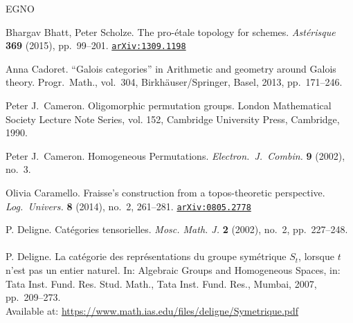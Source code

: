 \documentclass[12pt]{amsart}
\numberwithin{equation}{section}
\theoremstyle{definition}
\newcommand{\arxiv}[1]{\href{http://arxiv.org/abs/#1}{{\tiny\tt arXiv:#1}}}
\newcommand{\DOI}[1]{\href{http://doi.org/#1}{\color{purple}{\tiny\tt DOI:#1}}}
\begin{document}
\begin{thebibliography}{EGNO}

 Bhargav Bhatt, Peter Scholze. The pro-\'etale topology for schemes. \textit{Ast\'erisque} \textbf{369} (2015), pp.~99--201. \arxiv{1309.1198}

 Anna Cadoret. ``Galois categories'' in Arithmetic and geometry around Galois theory. Progr.\ Math., vol.\ 304, Birkh\"auser/Springer, Basel, 2013, pp.~171--246. \DOI{10.1007/978-3-0348-0487-5\_3}


 Peter J.\ Cameron. Oligomorphic permutation groups. London Mathematical Society Lecture Note Series, vol. 152, Cambridge University Press, Cambridge, 1990.

 Peter J.\ Cameron. Homogeneous Permutations. \textit{Electron.\ J.\ Combin.} \textbf{9} (2002), no.~3. \\ \DOI{10.37236/1674}

 Olivia Caramello. Fraisse's construction from a topos-theoretic perspective. \textit{Log.\ Univers.} \textbf{8} (2014), no.~2, 261--281. \DOI{10.1007/s11787-014-0104-6} \arxiv{0805.2778}


 P. Deligne. Cat\'egories tensorielles. \emph{Mosc. Math. J.} {\bf 2} (2002), no.~2, pp.~227--248. \\ \DOI{10.17323/1609-4514-2002-2-2-227-248} \\

 P. Deligne. La cat\'egorie des repr\'esentations du groupe sym\'etrique $S_t$, lorsque $t$ n’est pas un entier naturel. In: Algebraic Groups and Homogeneous Spaces, in: Tata Inst. Fund. Res. Stud. Math., Tata Inst. Fund. Res., Mumbai, 2007, pp.~209--273. \\
Available at: {\tiny\url{https://www.math.ias.edu/files/deligne/Symetrique.pdf}}


\end{thebibliography}
\end{document}
